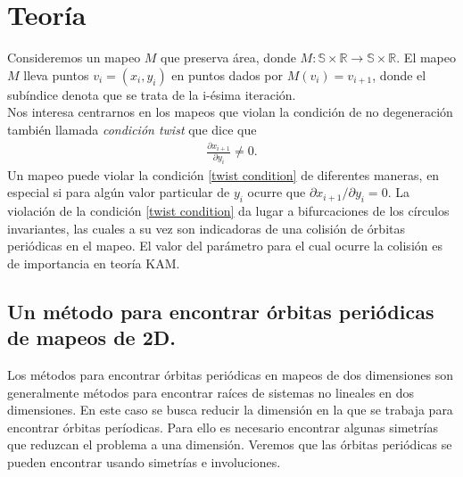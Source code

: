 
\chapter{Teor\'ia}
Consideremos un mapeo $M$ que preserva \'area, donde $M:\mathbb{S} \times \mathbb{R} \longrightarrow \mathbb{S}\times\mathbb{R}$. El mapeo $M$ lleva puntos $v_{i}= (x_{i},y_{i})$ en puntos dados por $M(v_{i})=v_{i+1}$, donde el sub\'indice denota que se trata de la i-\'esima iteraci\'on. \\

Nos interesa centrarnos en los mapeos que violan la condici\'on de no degeneraci\'on tambi\'en llamada \textit{condici\'on twist} \cite{Olvera} que dice que 
\begin{eqnarray}
\frac{\partial x_{i+1}}{\partial y_{i}} \neq 0.
\label{twist condition}
\end{eqnarray}
Un mapeo puede violar la condici\'on \ref{twist condition} de diferentes maneras, en especial si para alg\'un valor particular de $y_{i}$ ocurre que $\partial x_{i+1}/\partial y_{i} = 0$. La violaci\'on de la condici\'on \ref{twist condition} da lugar a bifurcaciones de los c\'irculos invariantes, las cuales a su vez son indicadoras de una colisi\'on de \'orbitas peri\'odicas en el mapeo. El valor del par\'ametro para el cual ocurre la colisi\'on es de importancia en teor\'ia KAM. 

\section{Un m\'etodo para encontrar \'orbitas peri\'odicas de mapeos de 2D.}

Los m\'etodos para encontrar \'orbitas peri\'odicas en mapeos de dos dimensiones son generalmente m\'etodos para encontrar ra\'ices de sistemas no lineales en dos dimensiones. En este caso se busca reducir la dimensi\'on en la que se trabaja para encontrar \'orbitas per\'iodicas. Para ello es necesario encontrar algunas simetr\'ias que reduzcan el problema a una dimensi\'on. Veremos que las \'orbitas peri\'odicas se pueden encontrar usando simetr\'ias e involuciones. \cite{GreeneA}\\

